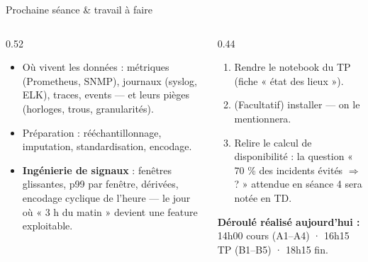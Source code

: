 \begin{frame}{Prochaine séance \& travail à faire}
\begin{columns}[t]
\begin{column}{0.52\textwidth}
\begin{ebox}
\begin{itemize}
\item Où vivent les données : métriques (Prometheus, SNMP), journaux (syslog, ELK),
traces, events --- et leurs pièges (horloges, trous, granularités).
\item Préparation : rééchantillonnage, imputation, standardisation, encodage.
\item \textbf{Ingénierie de signaux} : fenêtres glissantes, p99 par fenêtre,
dérivées, encodage cyclique de l'heure --- le jour où « 3 h du matin »
devient une feature exploitable.
\end{itemize}
\end{ebox}
\end{column}
\begin{column}{0.44\textwidth}
\begin{abox}
\begin{enumerate}
\item Rendre le notebook du TP (fiche « état des lieux »).
\item (Facultatif) installer  --- on le mentionnera.
\item Relire le calcul de disponibilité : la question « 70 \% des incidents
évités $\Rightarrow$ ? » attendue en séance 4 sera notée en TD.
\end{enumerate}
\end{abox}
\begin{center}\small
\textbf{Déroulé réalisé aujourd'hui :} 14h00 cours (A1--A4) · 16h15 TP (B1--B5) · 18h15 fin.
\end{center}
\end{column}
\end{columns}
\end{frame}
